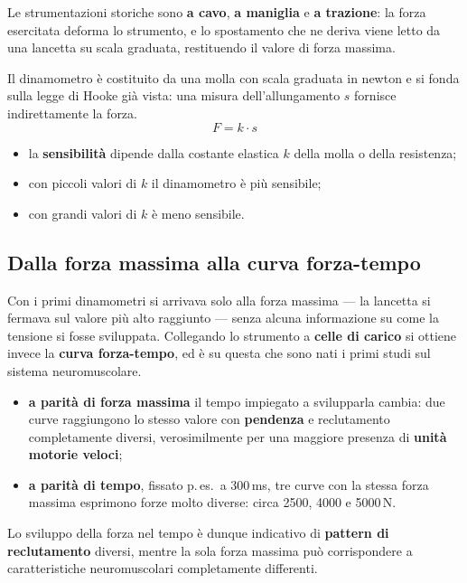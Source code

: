 Le strumentazioni storiche sono \textbf{a cavo}, \textbf{a maniglia} e \textbf{a trazione}: la
forza esercitata deforma lo strumento, e lo spostamento che ne deriva viene letto da una
lancetta su scala graduata, restituendo il valore di forza massima.

Il dinamometro è costituito da una molla con scala graduata in newton e si fonda sulla legge di
  Hooke già vista: una misura dell'allungamento $s$ fornisce indirettamente la forza.
\[ F = k \cdot s \]
\begin{itemize}
  \item la \textbf{sensibilità} dipende dalla costante elastica $k$ della molla o della resistenza;
  \item con piccoli valori di $k$ il dinamometro è più sensibile;
  \item con grandi valori di $k$ è meno sensibile.
\end{itemize}

\subsection{Dalla forza massima alla curva forza-tempo}

Con i primi dinamometri si arrivava solo alla forza massima --- la lancetta si fermava sul valore
  più alto raggiunto --- senza alcuna informazione su come la tensione si fosse sviluppata.
  Collegando lo strumento a \textbf{celle di carico} si ottiene invece la \textbf{curva
  forza-tempo}, ed è su questa che sono nati i primi studi sul sistema neuromuscolare.

\begin{itemize}
  \item \textbf{a parità di forza massima} il tempo impiegato a svilupparla cambia: due curve
    raggiungono lo stesso valore con \textbf{pendenza} e reclutamento completamente diversi,
    verosimilmente per una maggiore presenza di \textbf{unità motorie veloci};
  \item \textbf{a parità di tempo}, fissato p.\,es.\ a 300\,ms, tre curve con la stessa forza
    massima esprimono forze molto diverse: circa 2500, 4000 e 5000\,N.
\end{itemize}
Lo sviluppo della forza nel tempo è dunque indicativo di \textbf{pattern di reclutamento} diversi,
mentre la sola forza massima può corrispondere a caratteristiche neuromuscolari completamente
differenti.

